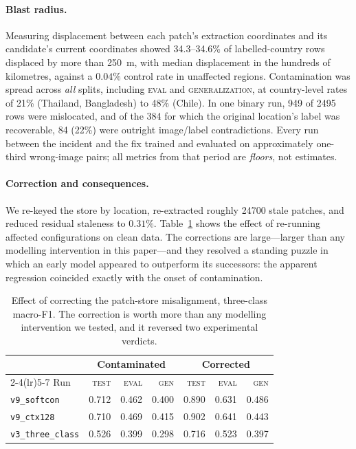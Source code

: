 \documentclass[11pt,a4paper]{article}
\newcommand{\code}[1]{\texttt{\small #1}}
\begin{document}
\paragraph{Blast radius.} Measuring displacement between each patch's extraction
coordinates and its candidate's current coordinates showed \num{34.3}--34.6\% of
labelled-country rows displaced by more than \SI{250}{\metre}, with median
displacement in the hundreds of kilometres, against a $0.04\%$ control rate in
unaffected regions. Contamination was spread across \emph{all} splits, including
\textsc{eval} and \textsc{generalization}, at country-level rates of 21\%
(Thailand, Bangladesh) to 48\% (Chile). In one binary run, 949 of \num{2495}
rows were mislocated, and of the 384 for which the original location's label was
recoverable, 84 (22\%) were outright image/label contradictions. Every run
between the incident and the fix trained and evaluated on approximately
one-third wrong-image pairs; all metrics from that period are \emph{floors},
not estimates.

\paragraph{Correction and consequences.} We re-keyed the store by location,
re-extracted roughly \num{24700} stale patches, and reduced residual staleness to
$0.31\%$. Table~\ref{tab:geofix} shows the effect of re-running affected
configurations on clean data. The corrections are large---larger than any
modelling intervention in this paper---and they resolved a standing puzzle in
which an early model appeared to outperform its successors: the apparent
regression coincided exactly with the onset of contamination.

\begin{table}[t]
\centering
\small
\caption{Effect of correcting the patch-store misalignment, three-class
macro-F1. The correction is worth more than any modelling intervention we
tested, and it reversed two experimental verdicts.}
\label{tab:geofix}
\begin{tabular}{lrrrrrr}
\toprule
& \multicolumn{3}{c}{Contaminated} & \multicolumn{3}{c}{Corrected} \\
\cmidrule(lr){2-4}\cmidrule(lr){5-7}
Run & \textsc{test} & \textsc{eval} & \textsc{gen} & \textsc{test} & \textsc{eval} & \textsc{gen} \\
\midrule
\code{v9\_softcon} & 0.712 & 0.462 & 0.400 & 0.890 & 0.631 & 0.486 \\
\code{v9\_ctx128}  & 0.710 & 0.469 & 0.415 & 0.902 & 0.641 & 0.443 \\
\code{v3\_three\_class} & 0.526 & 0.399 & 0.298 & 0.716 & 0.523 & 0.397 \\
\bottomrule
\end{tabular}
\end{table}
\end{document}
